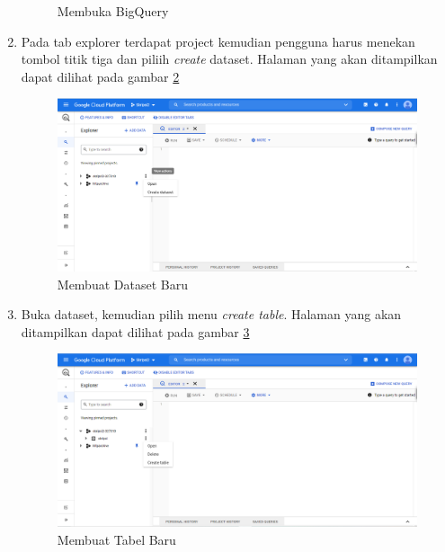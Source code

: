 \begin{enumerate}
\begin{figure}[H]
		\caption{Membuka BigQuery} 
		\label{fig:BQ} 
	\end{figure}
	\item Pada tab explorer terdapat project kemudian pengguna harus menekan tombol titik tiga dan piliih \textit{create} dataset. Halaman yang akan ditampilkan dapat dilihat pada gambar \ref{fig:create_dataset}
	\begin{figure}[H]
		\centering  
		\includegraphics[scale=0.45]{Gambar/create_dataset.PNG}  
		\caption{Membuat Dataset Baru} 
		\label{fig:create_dataset} 
	\end{figure}
	\item Buka dataset, kemudian pilih menu \textit{create table}. Halaman yang akan ditampilkan dapat dilihat pada gambar \ref{fig:create_table}
	\begin{figure}[H]
		\centering  
		\includegraphics[scale=0.45]{Gambar/create_table.PNG}  
		\caption{Membuat Tabel Baru} 
		\label{fig:create_table} 
	\end{figure}
\end{enumerate}

